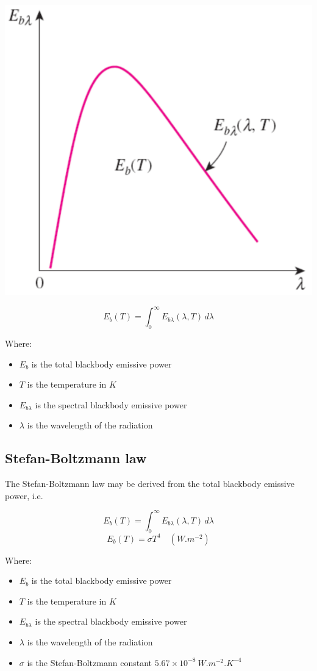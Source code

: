 \documentclass[11pt]{article}
\begin{document}
\begin{center}
\includegraphics[width=.9\linewidth]{./images/total-blackbody-emissive-power-graph.png}
\end{center}

\[E_b (T) = \int_0^{\infty} E_{b \lambda} (\lambda, T) \, d \lambda\]

Where:
\begin{itemize}
\item \(E_b\) is the total blackbody emissive power
\item \(T\) is the temperature in \(\unit{K}\)
\item \(E_{b \lambda}\) is the spectral blackbody emissive power
\item \(\lambda\) is the wavelength of the radiation
\end{itemize}

\subsection{Stefan-Boltzmann law}
\label{sec:orge7c0824}
The Stefan-Boltzmann law may be derived from the total blackbody emissive power, i.e.

\[E_b (T) = \int_0^{\infty} E_{b \lambda} (\lambda, T) \, d \lambda\]
\[E_b (T) = \sigma T^4 \quad (\unit{W.m^{-2}})\]

Where:
\begin{itemize}
\item \(E_b\) is the total blackbody emissive power
\item \(T\) is the temperature in \(\unit{K}\)
\item \(E_{b \lambda}\) is the spectral blackbody emissive power
\item \(\lambda\) is the wavelength of the radiation
\item \(\sigma\) is the Stefan-Boltzmann constant \(5.67 \times 10^{-8} \ \unit{W.m^{-2}.K^{-4}}\)
\end{itemize}
\end{document}
